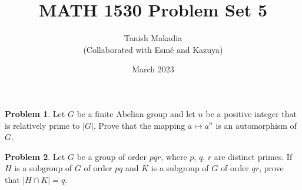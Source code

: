 \documentclass[12pt,reqno]{article}
\title{MATH 1530 Problem Set 5}
\author{Tanish Makadia\\\small{(Collaborated with Esmé and Kazuya)}}
\date{March 2023}
\theoremstyle{plain}
\theoremstyle{definition}
\newtheorem{problem}{Problem}
\begin{document}
\maketitle


\begin{problem} 
    Let $G$ be a finite Abelian group and let $n$ be a positive integer that is relatively prime to $|G|$.
    Prove that the mapping 
    $a \mapsto a^n$
    is an automorphism of $G$.
\end{problem}

\newpage
    

\begin{problem} 
    Let $G$ be a group of order $pqr$, where $p$, $q$, $r$ are distinct primes. If $H$ is a subgroup of $G$ of order $pq$ and $K$ is a subgroup of $G$ of order $qr$, prove that $|H \cap K| = q$.
\end{problem}
\end{document}
